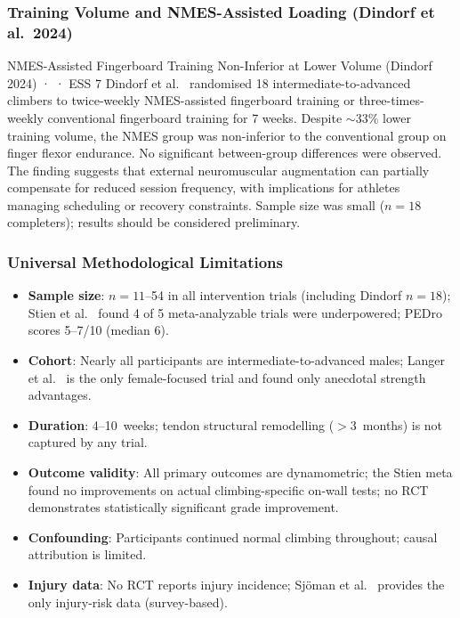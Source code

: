 \subsubsection{Training Volume and NMES-Assisted Loading (Dindorf et al.\ 2024)}

\begin{evidencebox}{NMES-Assisted Fingerboard Training Non-Inferior at Lower Volume (Dindorf 2024) · \evidencebacked · ESS 7}
Dindorf et al.\ \cite{DO24} randomised 18 intermediate-to-advanced climbers to twice-weekly NMES-assisted fingerboard training or three-times-weekly conventional fingerboard training for 7 weeks. Despite ${\sim}33\%$ lower training volume, the NMES group was non-inferior to the conventional group on finger flexor endurance. No significant between-group differences were observed. The finding suggests that external neuromuscular augmentation can partially compensate for reduced session frequency, with implications for athletes managing scheduling or recovery constraints. Sample size was small ($n = 18$ completers); results should be considered preliminary.
\end{evidencebox}

\subsubsection{Universal Methodological Limitations}

\begin{itemize}[noitemsep, topsep=2pt]
  \item \textbf{Sample size}: $n=11$--54 in all intervention trials (including Dindorf $n=18$); Stien et al.\ \cite{SO23} found 4 of 5 meta-analyzable trials were underpowered; PEDro scores 5--7/10 (median 6).
  \item \textbf{Cohort}: Nearly all participants are intermediate-to-advanced males; Langer et al.\ \cite{LAS24} is the only female-focused trial and found only anecdotal strength advantages.
  \item \textbf{Duration}: 4--10~weeks; tendon structural remodelling ($>\!3$~months) is not captured by any trial.
  \item \textbf{Outcome validity}: All primary outcomes are dynamometric; the Stien meta found no improvements on actual climbing-specific on-wall tests; no RCT demonstrates statistically significant grade improvement.
  \item \textbf{Confounding}: Participants continued normal climbing throughout; causal attribution is limited.
  \item \textbf{Injury data}: No RCT reports injury incidence; Sjöman et al.\ \cite{SGJ23} provides the only injury-risk data (survey-based).
\end{itemize}

